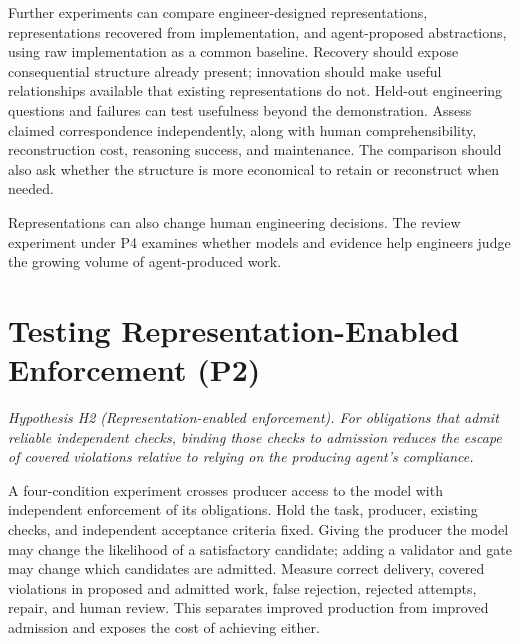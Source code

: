 Further experiments can compare engineer-designed representations, representations recovered from implementation, and agent-proposed abstractions, using raw implementation as a common baseline. Recovery should expose consequential structure already present; innovation should make useful relationships available that existing representations do not. Held-out engineering questions and failures can test usefulness beyond the demonstration. Assess claimed correspondence independently, along with human comprehensibility, reconstruction cost, reasoning success, and maintenance. The comparison should also ask whether the structure is more economical to retain or reconstruct when needed.


Representations can also change human engineering decisions. The review experiment under P4 examines whether models and evidence help engineers judge the growing volume of agent-produced work.

\section{Testing Representation-Enabled Enforcement (P2)}\label{heading:research-representation-enabled-enforcement}

\emph{Hypothesis H2 (Representation-enabled enforcement). For obligations that admit reliable independent checks, binding those checks to admission reduces the escape of covered violations relative to relying on the producing agent's compliance.}


A four-condition experiment crosses producer access to the model with independent enforcement of its obligations. Hold the task, producer, existing checks, and independent acceptance criteria fixed. Giving the producer the model may change the likelihood of a satisfactory candidate; adding a validator and gate may change which candidates are admitted. Measure correct delivery, covered violations in proposed and admitted work, false rejection, rejected attempts, repair, and human review. This separates improved production from improved admission and exposes the cost of achieving either.

